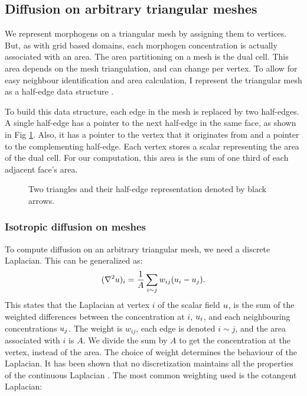 \begin{figure}[H]
\centering
{}
\end{figure}

\subsection{Diffusion on arbitrary triangular meshes}
We represent morphogens on a triangular mesh by assigning them to vertices. But, as with grid based domains, each morphogen concentration is actually associated with an area. The area partitioning on a mesh is the dual cell. This area depends on the mesh triangulation, and can change per vertex. To allow for easy neighbour identification and area calculation, I represent the triangular mesh as a half-edge data structure \citep{Mantyla1988}. 

To build this data structure, each edge in the mesh is replaced by two half-edges. A single half-edge has a pointer to the next half-edge in the same face, as shown in Fig \ref{fig:halfEdgeMesh}. Also, it has a pointer to the vertex that it originates from and a pointer to the complementing half-edge. Each vertex stores a scalar representing the area of the dual cell. For our computation, this area is the sum of one third of each adjacent face's area. %

\begin{figure}[H]
	\centering
	\caption{Two triangles and their half-edge representation denoted by black arrows.}
	\label{fig:halfEdgeMesh}
\end{figure}

\subsubsection*{Isotropic diffusion on meshes}
To compute diffusion on an arbitrary triangular mesh, we need a discrete Laplacian. This can be generalized as:
\[
(\nabla^2{} u)_i = \frac{1}{A} \sum_{i \sim j} w_{ij}(u_i - u_j).
\]
This states that the Laplacian at vertex $i$ of the scalar field $u$, is the sum of the weighted differences between the concentration at $i$, $u_i$, and each neighbouring concentrations $u_j$. The weight is $w_{ij}$, each edge is denoted $i \sim j$, and the area associated with $i$ is $A$. We divide the sum by $A$ to get the concentration at the vertex, instead of the area. The choice of weight determines the behaviour of the Laplacian. It has been shown that no discretization maintains all the properties of the continuous Laplacian \citep{Wardetzky2007}. The most common weighting used is the cotangent Laplacian:

